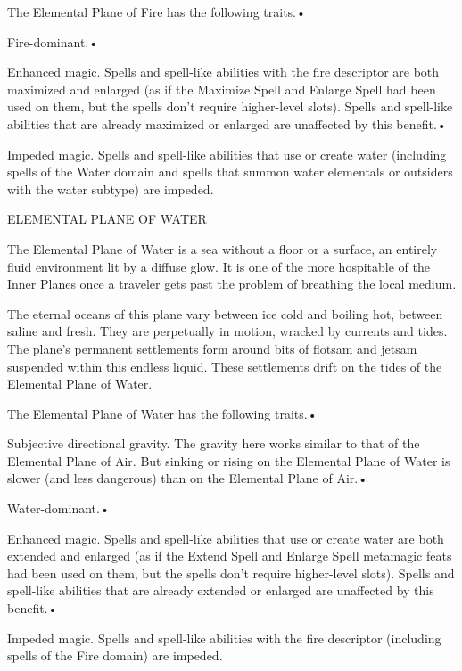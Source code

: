 \documentclass{article}
\begin{document}
The Elemental Plane of Fire has the following traits.• 

\parindent=3pt
Fire-dominant.• 

Enhanced magic. Spells and spell-like abilities with the fire descriptor are both 
maximized and enlarged (as if the Maximize Spell and Enlarge Spell had been used 
on them, but the spells don't require higher-level slots). Spells and spell-like 
abilities that are already maximized or enlarged are unaffected by this benefit.• 

\parindent=7pt
Impeded magic. Spells and spell-like abilities that use or create water (including 
spells of the Water domain and spells that summon water elementals or outsiders 
with the water subtype) are impeded. 

\vspace{12pt}
\parindent=0pt
ELEMENTAL PLANE OF WATER

The Elemental Plane of Water is a sea without a floor or a surface, an entirely 
fluid environment lit by a diffuse glow. It is one of the more hospitable of the 
Inner Planes once a traveler gets past the problem of breathing the local medium.

The eternal oceans of this plane vary between ice cold and boiling hot, between 
saline and fresh. They are perpetually in motion, wracked by currents and tides. 
The plane's permanent settlements form around bits of flotsam and jetsam suspended 
within this endless liquid. These settlements drift on the tides of the Elemental 
Plane of Water.

The Elemental Plane of Water has the following traits.• 

\parindent=3pt
Subjective directional gravity. The gravity here works similar to that of the Elemental 
Plane of Air. But sinking or rising on the Elemental Plane of Water is slower (and 
less dangerous) than on the Elemental Plane of Air.• 

Water-dominant.• 

\parindent=7pt
Enhanced magic. Spells and spell-like abilities that use or create water are both 
extended and enlarged (as if the Extend Spell and Enlarge Spell metamagic feats 
had been used on them, but the spells don't require higher-level slots). Spells 
and spell-like abilities that are already extended or enlarged are unaffected by 
this benefit.• 

\parindent=3pt
Impeded magic. Spells and spell-like abilities with the fire descriptor (including 
spells of the Fire domain) are impeded. 
\end{document}
